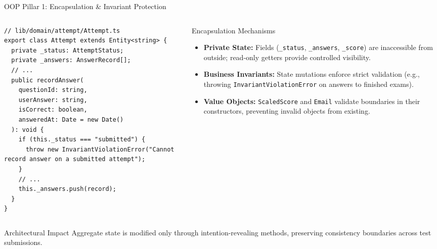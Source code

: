 ﻿\documentclass[aspectratio=169,10pt,t]{beamer}
\begin{document}
\begin{frame}[fragile]{OOP Pillar 1: Encapsulation \& Invariant Protection}
  \vspace{-1.0mm}
  \begin{columns}[T,onlytextwidth]
    \begin{column}{0.54\textwidth}
      \begin{codeBox}
\begin{lstlisting}
// lib/domain/attempt/Attempt.ts
export class Attempt extends Entity<string> {
  private _status: AttemptStatus;
  private _answers: AnswerRecord[];
  // ...
  public recordAnswer(
    questionId: string,
    userAnswer: string,
    isCorrect: boolean,
    answeredAt: Date = new Date()
  ): void {
    if (this._status === "submitted") {
      throw new InvariantViolationError("Cannot record answer on a submitted attempt");
    }
    // ...
    this._answers.push(record);
  }
}
\end{lstlisting}
      \end{codeBox}
    \end{column}

    \begin{column}{0.44\textwidth}
      \begin{infoCard}{Encapsulation Mechanisms}
        \begin{itemize}\setlength{\itemsep}{1.2pt}\setlength{\parskip}{0pt}\setlength{\leftmargini}{7pt}
          \item \textbf{Private State:} Fields (\texttt{\_status}, \texttt{\_answers}, \texttt{\_score}) are inaccessible from outside; read-only getters provide controlled visibility.
          \item \textbf{Business Invariants:} State mutations enforce strict validation (e.g., throwing \texttt{InvariantViolationError} on answers to finished exams).
          \item \textbf{Value Objects:} \texttt{ScaledScore} and \texttt{Email} validate boundaries in their constructors, preventing invalid objects from existing.
        \end{itemize}
      \end{infoCard}
    \end{column}
  \end{columns}

  \vspace{0.8mm}
  \begin{hlCard}{Architectural Impact}
    Aggregate state is modified only through intention-revealing methods, preserving consistency boundaries across test submissions.
  \end{hlCard}
\end{frame}
\end{document}

